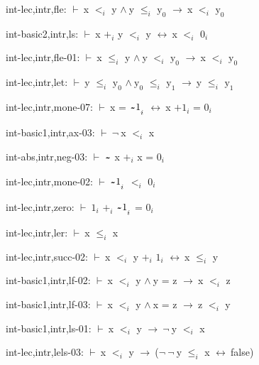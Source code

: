 \documentclass[a4paper]{article}
\newcommand{\tildesym}{\raisebox{-4pt}{\bf\~{}}}
\newcommand{\Fol}{\mbox{$\vdash\ $}}
\newcommand{\Not}{\mbox{$\neg\ $}}
\newcommand{\And}{\mbox{$\wedge\ $}}
\newcommand{\Imp}{\mbox{$\rightarrow\ $}}
\newcommand{\Equiv}{\mbox{$\leftrightarrow\ $}}
\begin{document}
int-lec,intr,fle: 
 \Fol x $\mbox{$<$}_{i}$ y \And y $\mbox{$\le$}_{i}$ $\mbox{y}_{0}$ \Imp x $\mbox{$<$}_{i}$ $\mbox{y}_{0}$



int-basic2,intr,ls: 
 \Fol x $\mbox{+}_{i}$ y $\mbox{$<$}_{i}$ y \Equiv x $\mbox{$<$}_{i}$ $\mbox{0}_{i}$



int-lec,intr,fle-01: 
 \Fol x $\mbox{$\le$}_{i}$ y \And y $\mbox{$<$}_{i}$ $\mbox{y}_{0}$ \Imp x $\mbox{$<$}_{i}$ $\mbox{y}_{0}$



int-lec,intr,let: 
 \Fol y $\mbox{$\le$}_{i}$ $\mbox{y}_{0}$ \And $\mbox{y}_{0}$ $\mbox{$\le$}_{i}$ $\mbox{y}_{1}$ \Imp y $\mbox{$\le$}_{i}$ $\mbox{y}_{1}$



int-lec,intr,mone-07: 
 \Fol x = $\mbox{$\tildesym$1}_{i}$ \Equiv x $\mbox{+1}_{i}$ = $\mbox{0}_{i}$



int-basic1,intr,ax-03: 
 \Fol \Not x $\mbox{$<$}_{i}$ x



int-abs,intr,neg-03: 
 \Fol $\tildesym$ x $\mbox{+}_{i}$ x = $\mbox{0}_{i}$



int-lec,intr,mone-02: 
 \Fol $\mbox{$\tildesym$1}_{i}$ $\mbox{$<$}_{i}$ $\mbox{0}_{i}$



int-lec,intr,zero: 
 \Fol $\mbox{1}_{i}$ $\mbox{+}_{i}$ $\mbox{$\tildesym$1}_{i}$ = $\mbox{0}_{i}$



int-lec,intr,ler: 
 \Fol x $\mbox{$\le$}_{i}$ x



int-lec,intr,succ-02: 
 \Fol x $\mbox{$<$}_{i}$ y $\mbox{+}_{i}$ $\mbox{1}_{i}$ \Equiv x $\mbox{$\le$}_{i}$ y



int-basic1,intr,lf-02: 
 \Fol x $\mbox{$<$}_{i}$ y \And y = z \Imp x $\mbox{$<$}_{i}$ z



int-basic1,intr,lf-03: 
 \Fol x $\mbox{$<$}_{i}$ y \And x = z \Imp z $\mbox{$<$}_{i}$ y



int-basic1,intr,ls-01: 
 \Fol x $\mbox{$<$}_{i}$ y \Imp \Not y $\mbox{$<$}_{i}$ x



int-lec,intr,lels-03: 
 \Fol x $\mbox{$<$}_{i}$ y \Imp (\Not \Not y $\mbox{$\le$}_{i}$ x \Equiv false)
\end{document}

